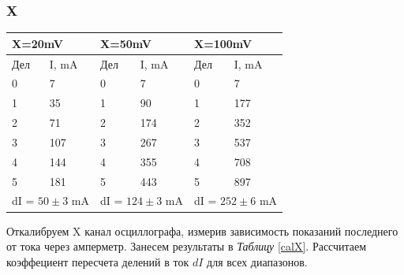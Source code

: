 \documentclass[12pt]{article}
\begin{document}
\subsubsection{X}
\begin{minipage}{0.6\textwidth}
\begin{center}
\begin{tabular}{|l|l|l|l|l|l|}
\hline
\multicolumn{2}{|l|}{X=20mV}             & \multicolumn{2}{l|}{X=50mV}             & \multicolumn{2}{l|}{X=100mV}             \\ \hline
Дел                & I, mA               & Дел               & I, mA               & Дел                & I, mA               \\ \hline
0                  & 7                   & 0                 & 7                   & 0                  & 7                   \\ \hline
1                  & 35                  & 1                 & 90                  & 1                  & 177                 \\ \hline
2                  & 71                  & 2                 & 174                 & 2                  & 352                 \\ \hline
3                  & 107                 & 3                 & 267                 & 3                  & 537                 \\ \hline
4                  & 144                 & 4                 & 355                 & 4                  & 708                 \\ \hline
5                  & 181                 & 5                 & 443                 & 5                  & 897                 \\ \hline
\multicolumn{2}{|l|}{dI = $50 \pm 3$ mA} & \multicolumn{2}{l|}{dI = $124 \pm 3$ mA} & \multicolumn{2}{l|}{dI = $252 \pm 6$ mA} \\ \hline
\end{tabular}
\label{calX}
\end{center}
\end{minipage}
\begin{minipage}{.4\textwidth}
Откалибруем X канал осциллографа, измерив зависимость показаний последнего от тока через амперметр. Занесем результаты в \textit{Таблицу} \ref{calX}. Рассчитаем коэффециент пересчета делений в ток $dI$ для всех диапазонов.
\end{minipage}
\end{document}

